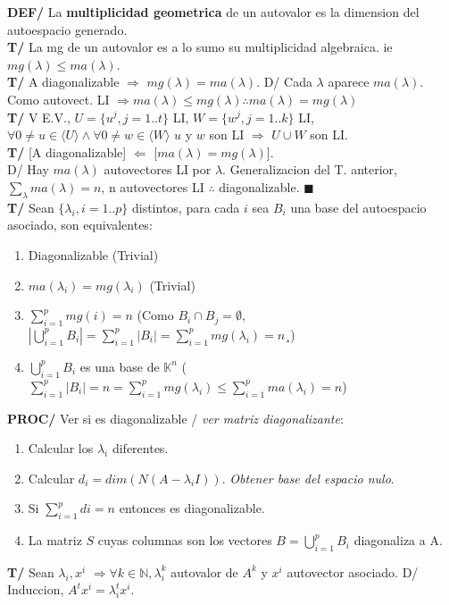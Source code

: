 \documentclass[10pt,a4paper]{article}
\newcommand*{\QEDA}{\null\nobreak\hfill\ensuremath{\blacksquare}}
\begin{document}
\dotfill

\textbf{DEF/} La \textbf{multiplicidad geometrica} de un autovalor es la dimension del autoespacio generado.\\
\textbf{T/} La mg de un autovalor es a lo sumo su multiplicidad algebraica. ie $mg(\lambda) \leq ma(\lambda)$.\\
\textbf{T/} A diagonalizable $\Rightarrow$ $mg(\lambda) = ma(\lambda)$. D/ Cada $\lambda$ aparece $ma(\lambda)$. Como autovect. LI $\Rightarrow ma(\lambda) \leq mg(\lambda) \therefore ma(\lambda)=mg(\lambda)$\\
\textbf{T/} V E.V., $U=\{u^j, j=1..t\}$ LI, $W=\{w^j, j=1..k\}$ LI, $\forall 0\not=u\in\langle U \rangle \land \forall 0\not=w\in\langle W \rangle$ $u$ y $w$ son LI $\Rightarrow$ $U \cup W$ son LI.\\
\textbf{T/} [A diagonalizable] $\Leftarrow$ [$ma(\lambda) = mg(\lambda)$].\\
D/ Hay $ma(\lambda)$ autovectores LI por $\lambda$. Generalizacion del T. anterior, $\sum_{\lambda} ma(\lambda) = n$, n autovectores LI $\therefore$ diagonalizable. \QEDA\\
\textbf{T/} Sean $\{\lambda_i, i=1..p\}$ distintos, para cada $i$ sea $B_i$ una base del autoespacio asociado, son equivalentes:
\begin{enumerate}
\item Diagonalizable (Trivial)
\item $ma(\lambda_i) = mg(\lambda_i)$ (Trivial)
\item $\sum_{i=1}^p mg(i) = n$ (Como $B_i \cap B_j = \emptyset$, $|\bigcup_{i=1}^p B_i| = \sum_{i=1}^p |B_i| = \sum_{i=1}^p mg(\lambda_i) = n$¸)
\item $\bigcup_{i=1}^p B_i$ es una base de $\mathbb{K}^n$ ($\sum_{i=1}^p |B_i| = n = \sum_{i=1}^p mg(\lambda_i) \leq \sum_{i=1}^p ma(\lambda_i) = n$)
\end{enumerate}
\textbf{PROC/} Ver si es diagonalizable / \textit{ver matriz diagonalizante}:
\begin{enumerate}
\item Calcular los $\lambda_i$ diferentes.
\item Calcular $d_i = dim(N(A-\lambda_i I))$. \textit{Obtener base del espacio nulo}.
\item Si $\sum_{i=1}^p di = n$ entonces es diagonalizable.
\item La matriz $S$ cuyas columnas son los vectores $B = \bigcup_{i=1}^p B_i$ diagonaliza a A.
\end{enumerate}
\textbf{T/} Sean $\lambda_i, x^i$ $\Rightarrow \forall k \in \mathbb{N}, \lambda_i^k$ autovalor de $A^k$ y $x^i$ autovector asociado. D/ Induccion, $A^tx^i = \lambda_i^tx^i$.\\
\end{document}
